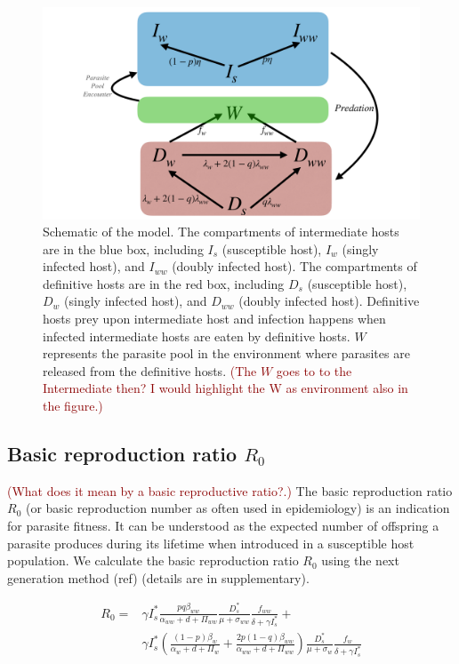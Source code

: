 \documentclass[11pt]{article}
\newcommand{\cha}[1]{\textcolor{darkred}{(#1)}}
\begin{document}
\begin{figure}[ht!]
\includegraphics[width=\textwidth]{Figures/schematic.pdf}
\caption{Schematic of the model. The compartments of intermediate hosts are in the blue box, including $I_s$ (susceptible host), $I_w$ (singly infected host), and $I_{ww}$ (doubly infected host). The compartments of definitive hosts are in the red box, including $D_s$ (susceptible host), $D_w$ (singly infected host), and $D_{ww}$ (doubly infected host). Definitive hosts prey upon intermediate host and infection happens when infected intermediate hosts are eaten by definitive hosts. 
$W$ represents the parasite pool in the environment where parasites are released from the definitive hosts.
\cha{The $W$ goes to to the Intermediate then? I would highlight the W as environment also in the figure.}
}
\label{fig:schematic}
\end{figure}

\subsection*{Basic reproduction ratio $R_0$}

\cha{What does it mean by a basic reproductive ratio?.}
The basic reproduction ratio $R_0$ (or basic reproduction number as often used in epidemiology) is an indication for parasite fitness. It can be understood as the expected number of offspring a parasite produces during its lifetime when introduced in a susceptible host population. We calculate the basic reproduction ratio $R_0$ using the next generation method (ref) (details are in supplementary).  

\begin{align}
R_0 = & \gamma I_s^* \frac{ p q \beta_{ww}}{\alpha_{ww} + d + \Pi_{ww}} \frac{D_s^*}{\mu +\sigma_{ww}} \frac{f_{ww}}{\delta +\gamma I_s^*} + \nonumber \\
& \gamma  I_s^* \left( \frac{ (1-p)\beta_w}{\alpha_w + d + \Pi_w} + \frac{2 p (1-q) \beta_{ww}}{\alpha_{ww} + d + \Pi_{ww}} \right) \frac{D_s^*}{\mu + \sigma_w} \frac{f_w}{\delta +\gamma  I_s^*}
\end{align}
\end{document}
